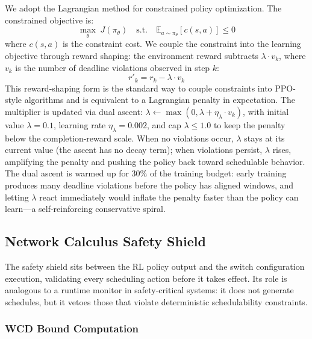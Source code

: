 \documentclass[conference]{IEEEtran}
\begin{document}
We adopt the Lagrangian method for constrained policy optimization. The constrained objective is:
\begin{equation}
\max_{\theta} \; J(\pi_\theta) \quad \text{s.t.} \quad \mathbb{E}_{a \sim \pi_\theta}[c(s,a)] \leq 0
\end{equation}
where $c(s,a)$ is the constraint cost. We couple the constraint into the learning objective through reward shaping: the environment reward subtracts $\lambda \cdot v_k$, where $v_k$ is the number of deadline violations observed in step $k$:
\begin{equation}
r'_k = r_k - \lambda \cdot v_k
\end{equation}
This reward-shaping form is the standard way to couple constraints into PPO-style algorithms and is equivalent to a Lagrangian penalty in expectation. The multiplier is updated via dual ascent: $\lambda \leftarrow \max(0, \lambda + \eta_\lambda \cdot v_k)$, with initial value $\lambda = 0.1$, learning rate $\eta_\lambda = 0.002$, and cap $\lambda \leq 1.0$ to keep the penalty below the completion-reward scale. When no violations occur, $\lambda$ stays at its current value (the ascent has no decay term); when violations persist, $\lambda$ rises, amplifying the penalty and pushing the policy back toward schedulable behavior. The dual ascent is warmed up for 30\% of the training budget: early training produces many deadline violations before the policy has aligned windows, and letting $\lambda$ react immediately would inflate the penalty faster than the policy can learn---a self-reinforcing conservative spiral.

\subsection{Network Calculus Safety Shield}

The safety shield sits between the RL policy output and the switch configuration execution, validating every scheduling action before it takes effect. Its role is analogous to a runtime monitor in safety-critical systems: it does not generate schedules, but it vetoes those that violate deterministic schedulability constraints.

\subsubsection{WCD Bound Computation}
\end{document}
